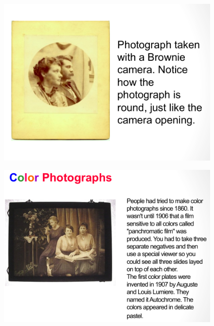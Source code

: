 \documentclass{beamer}
\begin{document}
\begin{frame}
	\begin{figure}
		\centering
		\includegraphics[scale=0.4]{104.jpg}
	\end{figure}
\end{frame}

\begin{frame}
	\begin{figure}
		\centering
		\includegraphics[scale=0.4]{105.jpg}
	\end{figure}
\end{frame}
\end{document}
